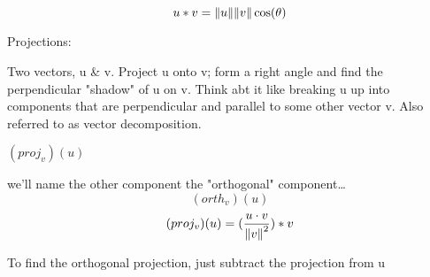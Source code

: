 \documentclass{article}
\begin{document}
\[
  u * v = \norm{u} \norm{v} \cos(\theta)
\]

Projections: 

Two vectors, u \& v. Project u onto v; form a right angle and find the perpendicular "shadow" of u on v. Think abt it like breaking u up into components that are perpendicular and parallel to some other vector v. Also referred to as vector decomposition.

$ (proj_v)(u) $

we'll name the other component the "orthogonal" component\dots
\[ (orth_v)(u) \]
\[ (proj_v)(u) = (\frac{u \cdot v}{\norm{v}^2}) * v \]

To find the orthogonal projection, just subtract the projection from u
\end{document}
